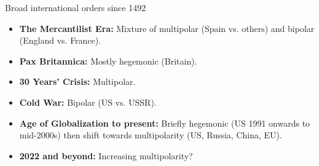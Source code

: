 \documentclass[handout]{beamer}
\begin{document}
\begin{frame}{\LARGE Broad international orders since 1492}
	\begin{itemize}
		\item \textbf{The Mercantilist Era:} \pause Mixture of multipolar (Spain vs. others) and bipolar (England vs. France). \pause
		\item \textbf{Pax Britannica:} \pause Mostly hegemonic (Britain). \pause
		\item \textbf{30 Years' Crisis:} \pause Multipolar.
		\item \textbf{Cold War:} \pause Bipolar (US vs. USSR). \pause
		\item \textbf{Age of Globalization to present:} \pause Briefly hegemonic (US 1991 onwards to mid-2000s) then shift towards multipolarity (US, Russia, China, EU).
		\item \textbf{2022 and beyond:} \pause Increasing multipolarity? 
	\end{itemize}
\end{frame}
\end{document}
